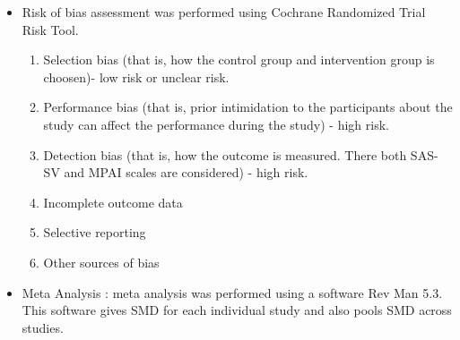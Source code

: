 \documentclass{article}
\begin{document}
\begin{enumerate}
\begin{itemize}
\begin{enumerate}
            \item Basketball
            \item Biofeedback : monitoring body's involuntary functions like heart rate using monitoring systems. Providing feedback/therapy based on that. \cite{biofeedback}
            \item Tai Chi : form of physical exercise, common in China
            \item Table Tennis
            \item Jump rope
            \item Combined Intervention
            \item Mindfulness-Based Therapy : form of talk therapy
            \item Cognitive Therapy : form of talk therapy
            \item Sanda : form of kickboxing, common in China
            \item Volleyball
            \item Yoga
        \end{enumerate}
        \item Risk of bias assessment was performed using Cochrane Randomized Trial Risk Tool.
        \begin{enumerate}
            \item Selection bias (that is, how the control group and intervention group is choosen)- low risk or unclear risk. 
            \item Performance bias (that is, prior intimidation to the participants about the study can affect the performance during the study) - high risk.
            \item Detection bias (that is, how the outcome is measured. There both SAS-SV and MPAI scales are considered) - high risk.
            \item Incomplete outcome data
            \item Selective reporting
            \item Other sources of bias
        \end{enumerate}
        \item Meta Analysis : meta analysis was performed using a software Rev Man 5.3.
        This software gives SMD for each individual study and also pools SMD across studies.


\end{itemize}
\end{enumerate}
\end{document}
